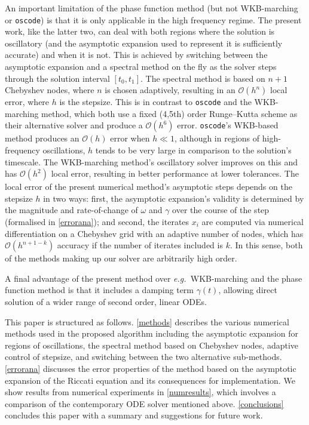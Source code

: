 \documentclass[10pt]{article}
\newcommand{\eg}{{\it e.g.\ }}
\newcommand{\bigO}{{\mathcal O}}
\newcommand{\om}{\omega}
\newcommand{\g}{\gamma}
\begin{document}
An important limitation of the phase function method (but not WKB-marching or
\texttt{oscode}) is that it is only applicable in the high frequency regime.
The present work, like the latter two, can deal with both regions where the
solution is oscillatory (and the asymptotic expansion used to represent it is
sufficiently accurate) and when it is not. This is achieved by switching
between the asymptotic expansion and a spectral method on the fly as the solver
steps through the solution interval $[t_0, t_1]$. The spectral method is based
on $n+1$ Chebyshev nodes, where $n$ is chosen adaptively, resulting in an
$\bigO(h^{n})$ local error, where $h$ is the stepsize. This is in contrast to
\texttt{oscode} and the WKB-marching method, which both use a fixed (4,5th)
order Runge--Kutta scheme as their alternative solver and produce a
$\bigO(h^6)$ error. \texttt{oscode}'s WKB-based method produces an $\bigO(h)$
error when $h \ll 1$, although in regions of high-frequency oscillations, $h$
tends to be very large in comparison to the solution's timescale. The
WKB-marching method's oscillatory solver improves on this and has $\bigO(h^2)$ local error,
resulting in better performance at lower tolerances. The local error of the
present numerical method's asymptotic steps depends on the stepsize $h$ in two
ways: first, the asymptotic expansion's validity is determined by the magnitude
and rate-of-change of $\om$ and $\g$ over the course of the step (formalised in
\cref{errorana}); and second, the iterates $x_i$ are computed via numerical
differentiation on a Chebyshev grid with an adaptive number of nodes, which has
$\bigO(h^{n+1-k})$ accuracy if the number of iterates included is $k$. In this
sense, both of the methods making up our solver are arbitrarily high order.

%
A final advantage of the present method over \eg WKB-marching and the phase function method
is that it includes a damping term $\g(t)$, allowing direct solution of a wider
range of second order, linear ODEs.

This paper is structured as follows. \cref{methods} describes the various
numerical methods used in the proposed algorithm including the asymptotic
expansion for regions of oscillations, the spectral method based on Chebyshev
nodes, adaptive control of stepsize, and switching between the two alternative
sub-methods. \cref{errorana} discusses the error properties of the method based
on the asymptotic expansion of the Riccati equation and its consequences for
implementation. We show results from numerical experiments in
\cref{numresults}, which involves a comparison of the contemporary ODE solver
mentioned above. \cref{conclusions} concludes this paper with a summary and
suggestions for future work.
\end{document}
